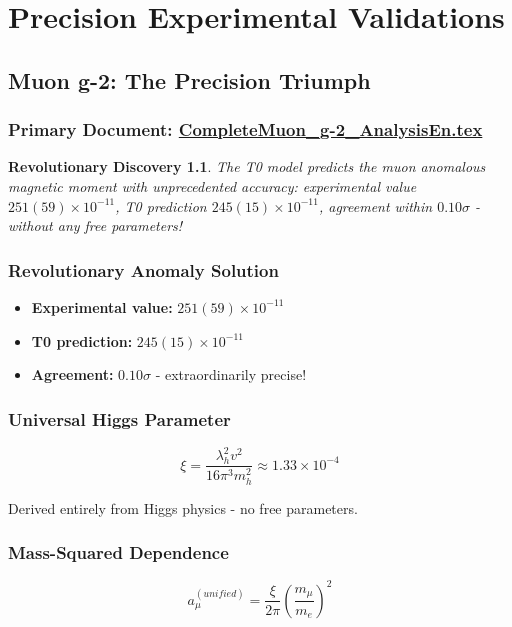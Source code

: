 \documentclass[12pt,a4paper]{report}
\newtheorem{discovery}{Revolutionary Discovery}[chapter]
\begin{document}
	\chapter{Precision Experimental Validations}
	
	\section{Muon g-2: The Precision Triumph}
	\subsection{Primary Document: \href{https://github.com/jpascher/T0-Time-Mass-Duality/tree/main/2/pdf/CompleteMuon_g-2_AnalysisEn.pdf}{CompleteMuon\_g-2\_AnalysisEn.tex}}
	
	\begin{discovery}
		The T0 model predicts the muon anomalous magnetic moment with unprecedented accuracy: experimental value $251(59)\times10^{-11}$, T0 prediction $245(15)\times10^{-11}$, agreement within $0.10\sigma$ - without any free parameters!
	\end{discovery}
	
	\subsection{Revolutionary Anomaly Solution}
	\begin{itemize}
		\item \textbf{Experimental value:} $251(59) \times 10^{-11}$
		\item \textbf{T0 prediction:} $245(15) \times 10^{-11}$
		\item \textbf{Agreement:} $0.10\sigma$ - extraordinarily precise!
	\end{itemize}
	
	\subsection{Universal Higgs Parameter}
	$$\xi = \frac{\lambda_h^2 v^2}{16\pi^3 m_h^2} \approx 1.33 \times 10^{-4}$$
	
	Derived entirely from Higgs physics - no free parameters.
	
	\subsection{Mass-Squared Dependence}
	$$a_\mu^{(unified)} = \frac{\xi}{2\pi}\left(\frac{m_\mu}{m_e}\right)^2$$
	
\end{document}
